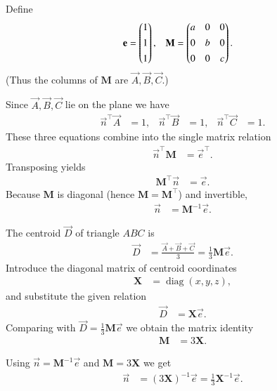 \documentclass[journal]{IEEEtran}
\begin{document}
Define
\begin{align}
\mathbf{e} &= \begin{pmatrix}1\\[4pt]1\\[4pt]1\end{pmatrix}, &
\mathbf{M} &= \begin{pmatrix}a&0&0\\[4pt]0&b&0\\[4pt]0&0&c\end{pmatrix}.
\end{align}
(Thus the columns of $\mathbf{M}$ are $\vec{A},\vec{B},\vec{C}$.)

Since $\vec{A},\vec{B},\vec{C}$ lie on the plane we have
\begin{align}
\vec{n}^{\top}\vec{A} &= 1, & 
\vec{n}^{\top}\vec{B} &= 1, & 
\vec{n}^{\top}\vec{C} &= 1.
\end{align}
These three equations combine into the single matrix relation
\begin{align}
\vec{n}^{\top}\mathbf{M} &= \vec{e}^{\top}.
\end{align}
Transposing yields
\begin{align}
\mathbf{M}^{\top}\vec{n} &= \vec{e}.
\end{align}
Because $\mathbf{M}$ is diagonal (hence $\mathbf{M}=\mathbf{M}^{\top}$) and invertible,
\begin{align}
\vec{n} &= \mathbf{M}^{-1}\vec{e}.
\end{align}

The centroid $\vec{D}$ of triangle $ABC$ is
\begin{align}
\vec{D} &= \frac{\vec{A}+\vec{B}+\vec{C}}{3}
= \tfrac{1}{3}\mathbf{M}\vec{e}.
\end{align}
Introduce the diagonal matrix of centroid coordinates
\begin{align}
\mathbf{X} &= \operatorname{diag}(x,y,z),
\end{align}
and substitute the given relation
\begin{align}
\vec{D} &= \mathbf{X}\vec{e}.
\end{align}
Comparing with $\vec{D}=\tfrac{1}{3}\mathbf{M}\vec{e}$ we obtain the matrix identity
\begin{align}
\mathbf{M} &= 3\mathbf{X}.
\end{align}

Using $\vec{n}=\mathbf{M}^{-1}\vec{e}$ and $\mathbf{M}=3\mathbf{X}$ we get
\begin{align}
\vec{n} &= (3\mathbf{X})^{-1}\vec{e}
      = \tfrac{1}{3}\mathbf{X}^{-1}\vec{e}.
\end{align}
\end{document}
